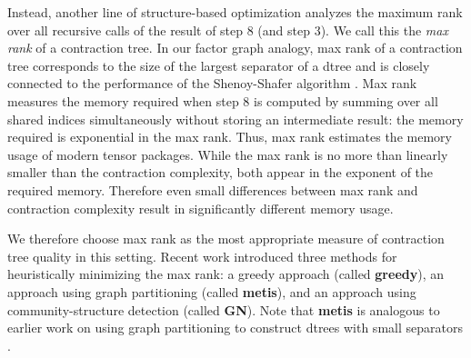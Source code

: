 Instead, another line of structure-based optimization analyzes the maximum rank over all recursive calls of the result of step 8 (and step 3). We call this the \emph{max rank} of a contraction tree. In our factor graph analogy, max rank of a contraction tree corresponds to the size of the largest separator of a dtree \cite{darwiche01b} and is closely connected to the performance of the Shenoy-Shafer algorithm \cite{shenoy97,SS08}. Max rank measures the memory required when step 8 is computed by summing over all shared indices simultaneously without storing an intermediate result: the memory required is exponential in the max rank. Thus, max rank estimates the memory usage of modern tensor packages. While the max rank is no more than linearly smaller than the contraction complexity, both appear in the exponent of the required memory. Therefore even small differences between max rank and contraction complexity result in significantly different memory usage. 

We therefore choose max rank as the most appropriate measure of contraction tree quality in this setting. 
Recent work \cite{KCMR18} introduced three methods for heuristically minimizing the max rank: a greedy approach (called \textbf{greedy}), an approach using graph partitioning (called \textbf{metis}), and an approach using community-structure detection (called \textbf{GN}). Note that \textbf{metis} is analogous to earlier work on using graph partitioning to construct dtrees with small separators \cite{darwiche01b}.